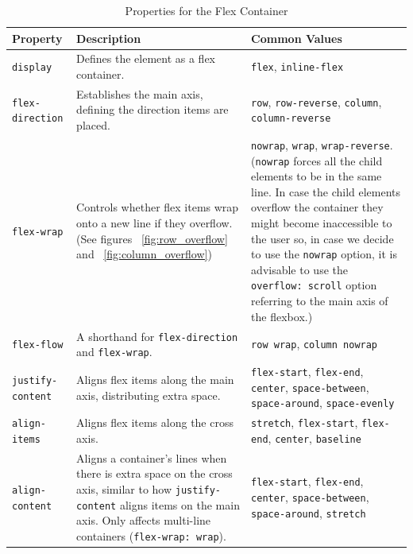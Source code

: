 \documentclass{scrbook}
\begin{document}
\begin{table}[h]
    \centering
    \begin{tabularx}{\linewidth}{|l|X|X|}
        \hline
        \textbf{Property} & \textbf{Description} & \textbf{Common Values} \\
        \hline
        \texttt{display} & Defines the element as a flex container. & \texttt{flex}, \texttt{inline-flex} \\
        \hline
        \texttt{flex-direction} & Establishes the main axis, defining the direction items are placed. & \texttt{row}, \texttt{row-reverse}, \texttt{column}, \texttt{column-reverse} \\
        \hline
        
        \texttt{flex-wrap} & Controls whether flex items wrap onto a new line if they overflow. (See figures ~\ref{fig:row_overflow} and ~\ref{fig:column_overflow}) &
        \texttt{nowrap}, \texttt{wrap}, \texttt{wrap-reverse}. (\texttt{nowrap} forces all the child elements to be in the same line. In case the child elements overflow the container they might become inaccessible to the user so, in case we decide to use the \texttt{nowrap} option, it is advisable to use the \texttt{overflow: scroll} option referring to the main axis of the flexbox.) \\
        \hline
        
        \texttt{flex-flow} & A shorthand for \texttt{flex-direction} and \texttt{flex-wrap}. & \texttt{row wrap}, \texttt{column nowrap} \\
        \hline
        \texttt{justify-content} & Aligns flex items along the main axis, distributing extra space. & \texttt{flex-start}, \texttt{flex-end}, \texttt{center}, \texttt{space-between}, \texttt{space-around}, \texttt{space-evenly} \\
        \hline
        \texttt{align-items} & Aligns flex items along the cross axis. & \texttt{stretch}, \texttt{flex-start}, \texttt{flex-end}, \texttt{center}, \texttt{baseline} \\
        \hline
        \texttt{align-content} & Aligns a container's lines when there is extra space on the cross axis, similar to how \texttt{justify-content} aligns items on the main axis. Only affects multi-line containers (\texttt{flex-wrap: wrap}). & \texttt{flex-start}, \texttt{flex-end}, \texttt{center}, \texttt{space-between}, \texttt{space-around}, \texttt{stretch} \\
        \hline
    \end{tabularx}
    \caption{Properties for the Flex Container}
\end{table}
\end{document}
